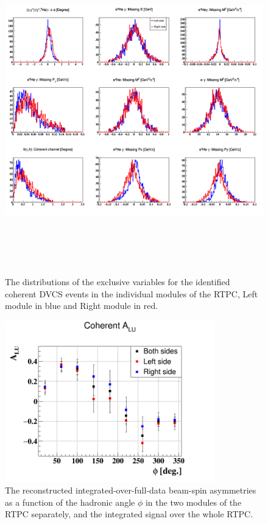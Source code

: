 \begin{figure}[tbp]
      \centering
      \includegraphics[height=14.2cm]{fig_dvcs/all_coh_exc_cuts_final_sides.png}
      \caption{The distributions of the exclusive variables for the identified
      coherent DVCS events in the individual modules of the RTPC, Left module 
   in blue and Right module in red.}                             
   \label{fig:sides_rtpc_exclusivity}
   \end{figure}

   \begin{figure}[tbp]
      \centering
      \includegraphics[height=7.0cm]{fig_dvcs/BSA_Coherent_sides.png}
      \caption{The reconstructed integrated-over-full-data beam-spin 
      asymmetries as a function of the hadronic angle $\phi$ in the two modules 
   of the RTPC separately, and the integrated signal over the whole RTPC.}
      \label{fig:coherent_alu_sides}
       \end{figure}




